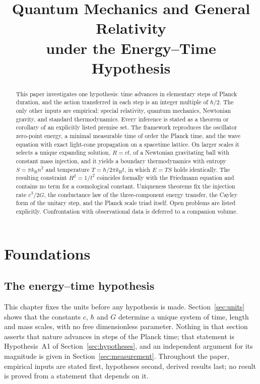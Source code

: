\documentclass[11pt]{amsbook}
\title[Quantum Mechanics and General Relativity under the Energy--Time Hypothesis]{Quantum Mechanics and General Relativity\\ under the Energy--Time Hypothesis}
\author{}
\date{}
\theoremstyle{plain}
\theoremstyle{definition}
\theoremstyle{remark}
\begin{document}
\begin{abstract}
This paper investigates one hypothesis: time advances in elementary steps of Planck duration, and the action transferred in each step is an integer multiple of $\hbar/2$. The only other inputs are empirical: special relativity, quantum mechanics, Newtonian gravity, and standard thermodynamics. Every inference is stated as a theorem or corollary of an explicitly listed premise set. The framework reproduces the oscillator zero-point energy, a minimal measurable time of order the Planck time, and the wave equation with exact light-cone propagation on a spacetime lattice. On larger scales it selects a unique expanding solution, $R = ct$, of a Newtonian gravitating ball with constant mass injection, and it yields a boundary thermodynamics with entropy $S = \pi k_{\mathrm B} n^{2}$ and temperature $T = \hbar/2\pi k_{\mathrm B} t$, in which $E = TS$ holds identically. The resulting constraint $H^{2} = 1/t^{2}$ coincides formally with the Friedmann equation and contains no term for a cosmological constant. Uniqueness theorems fix the injection rate $c^{3}/2G$, the conductance law of the three-component energy transfer, the Cayley form of the unitary step, and the Planck scale triad itself. Open problems are listed explicitly. Confrontation with observational data is deferred to a companion volume.
\end{abstract}


\maketitle
\tableofcontents

\part{Foundations}

\chapter{The energy--time hypothesis}\label{ch:eth}

This chapter fixes the units before any hypothesis is made. Section~\ref{sec:units} shows that the constants $c$, $\hbar$ and $G$ determine a unique system of time, length and mass scales, with no free dimensionless parameter. Nothing in that section asserts that nature advances in steps of the Planck time; that statement is Hypothesis~A1 of Section~\ref{sec:hypotheses}, and an independent argument for its magnitude is given in Section~\ref{sec:measurement}. Throughout the paper, empirical inputs are stated first, hypotheses second, derived results last; no result is proved from a statement that depends on it.
\end{document}
